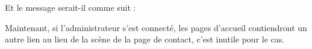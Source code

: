 \documentclass{article}
\begin{document}
\begin{enumerate}
  
  \vspace{0.7cm}
               \hspace*{-0.7in}
               \noindent{} 
  
  
  Et le message serait-il comme suit :
 
  
   \vspace{0.7cm}
               \hspace*{-0.7in}
               \noindent{} 
  
  
  
  
  
  
  
Maintenant, si l'administrateur s'est connecté, les pages d'accueil contiendront un autre lien au lieu de la scène de la page de contact, c'est inutile pour le cas.
  

\end{enumerate}
\end{document}
